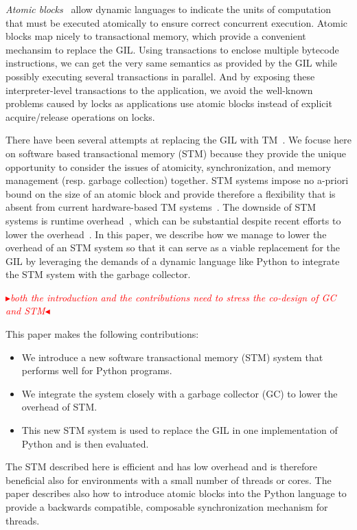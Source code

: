 \documentclass{sigplanconf}
\newcommand{\mynote}[2]{%
  \textcolor{red}{%
    \fbox{\bfseries\sffamily\scriptsize#1}%
    {\small$\blacktriangleright$\textsf{\emph{#2}}$\blacktriangleleft$}%
  }%
}
\newcommand\cfbolz[1]{\mynote{cfbolz}{#1}}
\begin{document}
\emph{Atomic
blocks}~\cite{tim03,tim05} allow dynamic languages to indicate
the units of computation that must be executed atomically to ensure correct concurrent
execution.  Atomic blocks map nicely to transactional memory, which provide a convenient
mechansim to replace the GIL.
 Using transactions to enclose
multiple bytecode instructions, we can get the very same semantics as
provided by the GIL while possibly executing several transactions in
parallel. And by exposing these interpreter-level
transactions to the application, we
avoid the well-known problems caused by locks as applications use atomic blocks instead
of explicit acquire/release operations on locks.

There have been several attempts at replacing the GIL with
TM~\cite{nicholas06,odaira14,fuad10}.
We focuse here on
software based transactional memory (STM)
because they provide the unique opportunity to consider the issues of atomicity,
synchronization, and memory management (resp. garbage collection) together.
STM systems impose no a-priori bound on the size of an atomic block and provide therefore
a flexibility that is absent from current hardware-based TM systems~\cite{wayforward14}.
The downside of STM systems is runtime overhead~\cite{cascaval08,drago11}, which can
be substantial despite recent efforts to lower the overhead~\cite{warmhoff13,spear09}.
In this paper, we describe how we manage to lower the overhead of an
STM system so that it can serve as a viable replacement for the GIL by leveraging the
demands of a dynamic language like Python to integrate the STM system with the garbage
collector.



\cfbolz{both the introduction and the contributions need to stress the co-design of GC and STM}

This paper makes the following contributions:
\begin{itemize}[noitemsep]
\item We introduce a new software transactional memory (STM) system
  that performs well for Python programs.
\item We integrate the  system closely with a garbage collector
  (GC) to lower the overhead of STM.
\item This new STM system is used to replace the GIL in one
  implementation of Python and is then evaluated.
\end{itemize}
The STM described here is efficient and has low overhead and is therefore beneficial also
for environments with a small number of threads or cores. The paper describes also
how to introduce atomic blocks into the Python language to provide a
  backwards compatible, composable synchronization mechanism for
  threads.
\end{document}
